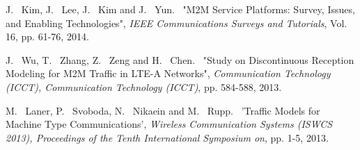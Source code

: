 \documentclass[journal]{IEEEtran}
\begin{document}

%
%
%
\begin{thebibliography}{1}

J. ~Kim, J. ~Lee, J. ~Kim and J. ~Yun. ~"M2M Service Platforms: Survey, Issues, and Enabling Technologies", \emph{IEEE Communications Surveys and Tutorials}, Vol. 16, pp. 61-76, 2014.

J. ~Wu, T. ~Zhang, Z. ~Zeng and H. ~Chen. ~"Study on Discontinuous Reception Modeling for M2M Traffic in LTE-A Networks", \emph{Communication Technology (ICCT), Communication Technology (ICCT)}, pp. 584-588, 2013.

M. ~Laner, P. ~Svoboda, N. ~Nikaein and M. ~Rupp. ~'Traffic Models for Machine Type Communications', \emph{Wireless Communication Systems (ISWCS 2013), Proceedings of the Tenth International Symposium on}, pp. 1-5, 2013.
  
\end{thebibliography}
\end{document}
